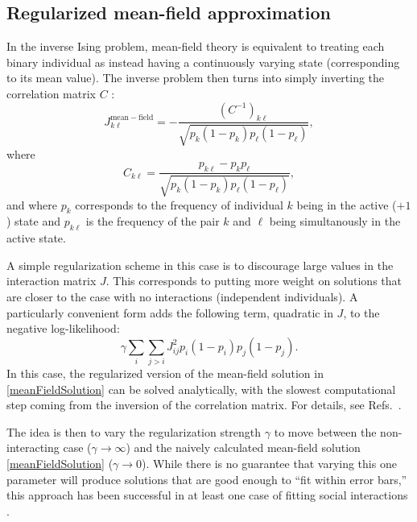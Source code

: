 \documentclass[aps,prl,twocolumn]{revtex4-1}
\begin{document}
\subsection{Regularized mean-field approximation}
In the inverse Ising problem, mean-field theory is equivalent
to treating each binary individual as instead having a continuously varying state
(corresponding to its mean value).  The inverse problem then turns into simply inverting
the correlation matrix $C$ \cite{CocMon12}: 
\begin{equation}
\label{meanFieldSolution}
J^{\mathrm{mean-field}}_{k\ell} =
    - \frac{ (C^{-1})_{k\ell} }{ \sqrt{p_k(1-p_k)p_\ell(1-p_\ell)} },
\end{equation}
where
\begin{equation}
C_{k\ell} = \frac{ p_{k\ell} - p_k p_\ell }{ \sqrt{p_k(1-p_k)p_\ell(1-p_\ell)} },
\end{equation}
and where $p_k$ corresponds to the frequency of individual $k$ being
in the active ($+1$) state and $p_{k\ell}$ is the frequency of the pair
$k$ and $\ell$ being simultanously in the active state.

A simple regularization scheme in this case is to discourage large values in the interaction
matrix $J$.  This corresponds to putting more weight on solutions that are closer to
the case with no interactions (independent individuals).  A particularly convenient form
adds the following term, quadratic in $J$, to the negative log-likelihood:
\begin{equation}
\gamma \sum_i \sum_{j > i} J_{ij}^2 p_i (1-p_i) p_j (1-p_j).
\end{equation}
In this case, the regularized version of the mean-field solution in \eqref{meanFieldSolution}
can be solved analytically, with the slowest computational step coming from the inversion
of the correlation matrix.  For details, see Refs.~\cite{DanKraFla17,BarCoc13}.

The idea is then to vary the regularization strength $\gamma$ to move between the
non-interacting case ($\gamma \rightarrow \infty$) and the naively calculated
mean-field solution \eqref{meanFieldSolution} ($\gamma \rightarrow 0$).
While there is no guarantee that varying this one parameter will produce solutions that are
good enough to ``fit within error bars,'' this approach has been successful in at least
one case of fitting social interactions \cite{DanKraFla17}.
\end{document}
